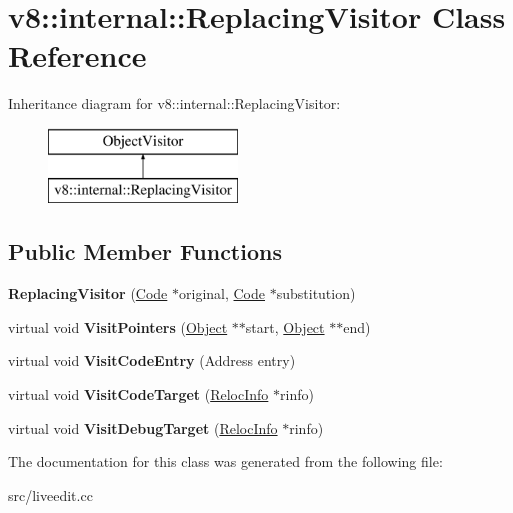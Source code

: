 \hypertarget{classv8_1_1internal_1_1_replacing_visitor}{}\section{v8\+:\+:internal\+:\+:Replacing\+Visitor Class Reference}
\label{classv8_1_1internal_1_1_replacing_visitor}
Inheritance diagram for v8\+:\+:internal\+:\+:Replacing\+Visitor\+:\begin{figure}[H]
\begin{center}
\leavevmode
\includegraphics[height=2.000000cm]{classv8_1_1internal_1_1_replacing_visitor}
\end{center}
\end{figure}
\subsection*{Public Member Functions}
\begin{DoxyCompactItemize}
\item 
\hypertarget{classv8_1_1internal_1_1_replacing_visitor_aa27b8ea53b02b63a7a40cbf04985c179}{}{\bfseries Replacing\+Visitor} (\hyperlink{classv8_1_1internal_1_1_code}{Code} $\ast$original, \hyperlink{classv8_1_1internal_1_1_code}{Code} $\ast$substitution)\label{classv8_1_1internal_1_1_replacing_visitor_aa27b8ea53b02b63a7a40cbf04985c179}

\item 
\hypertarget{classv8_1_1internal_1_1_replacing_visitor_aee7bc81114f33f7443496dd25ff8d8ed}{}virtual void {\bfseries Visit\+Pointers} (\hyperlink{classv8_1_1internal_1_1_object}{Object} $\ast$$\ast$start, \hyperlink{classv8_1_1internal_1_1_object}{Object} $\ast$$\ast$end)\label{classv8_1_1internal_1_1_replacing_visitor_aee7bc81114f33f7443496dd25ff8d8ed}

\item 
\hypertarget{classv8_1_1internal_1_1_replacing_visitor_a605ad3801debee31d3ebe1ba9aae3b15}{}virtual void {\bfseries Visit\+Code\+Entry} (Address entry)\label{classv8_1_1internal_1_1_replacing_visitor_a605ad3801debee31d3ebe1ba9aae3b15}

\item 
\hypertarget{classv8_1_1internal_1_1_replacing_visitor_ae44ef4079c791f00ee045ec7a7475a6d}{}virtual void {\bfseries Visit\+Code\+Target} (\hyperlink{classv8_1_1internal_1_1_reloc_info}{Reloc\+Info} $\ast$rinfo)\label{classv8_1_1internal_1_1_replacing_visitor_ae44ef4079c791f00ee045ec7a7475a6d}

\item 
\hypertarget{classv8_1_1internal_1_1_replacing_visitor_a7856d55370a7b30d6d5d45e891e69593}{}virtual void {\bfseries Visit\+Debug\+Target} (\hyperlink{classv8_1_1internal_1_1_reloc_info}{Reloc\+Info} $\ast$rinfo)\label{classv8_1_1internal_1_1_replacing_visitor_a7856d55370a7b30d6d5d45e891e69593}

\end{DoxyCompactItemize}


The documentation for this class was generated from the following file\+:\begin{DoxyCompactItemize}
\item 
src/liveedit.\+cc\end{DoxyCompactItemize}
